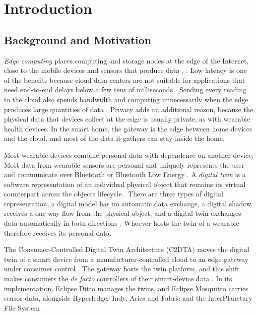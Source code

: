 \chapter{Introduction}\label{chapter-1.-introduction}

\section{Background and Motivation}\label{background-and-motivation}

\noindent \emph{Edge computing} places computing and storage nodes at the edge of the Internet, close to the mobile devices and sensors that produce data \cite{word01}, \cite{word02}. Low latency is one of the benefits because cloud data centers are not suitable for applications that need end-to-end delays below a few tens of milliseconds \cite{word01}. Sending every reading to the cloud also spends bandwidth and computing unnecessarily when the edge produces large quantities of data \cite{word02}. Privacy adds an additional reason, because the physical data that devices collect at the edge is usually private, as with wearable health devices\cite{word02}. In the smart home, the gateway is the edge between home devices and the cloud, and most of the data it gathers can stay inside the home\cite{word02}.

Most wearable devices combine personal data with dependence on another device. Most data from wearable sensors are personal and uniquely represents the user and communicate over Bluetooth or Bluetooth Low Energy \cite{word03}. A \emph{digital twin} is a software representation of an individual physical object that remains its virtual counterpart across the object\textquotesingle s lifecycle \cite{word04}. There are three types of digital representation, a digital model has no automatic data exchange, a digital shadow receives a one-way flow from the physical object, and a digital twin exchanges data automatically in both directions \cite{word05}. Whoever hosts the twin of a wearable therefore receives its personal data.

The Consumer-Controlled Digital Twin Architecture (C2DTA) moves the digital twin of a smart device from a manufacturer-controlled cloud to an edge gateway under consumer control \cite{word06}. The gateway hosts the twin platform, and this shift makes consumers the \emph{de facto} controllers of their smart-device data \cite{word06}. In its implementation, Eclipse Ditto manages the twins, and Eclipse Mosquitto carries sensor data, alongside Hyperledger Indy, Aries and Fabric and the InterPlanetary File System \cite{word06}.

